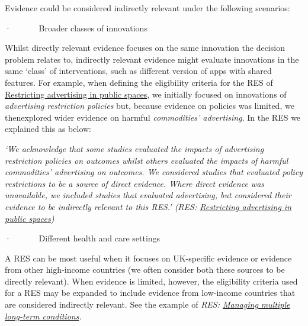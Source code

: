 \documentclass[
  letterpaper,
  DIV=11,
  numbers=noendperiod]{scrreprt}
\begin{document}
Evidence could be considered indirectly relevant under the following
scenarios:

·~~~~~~ Broader classes of innovations

Whilst directly relevant evidence focuses on the same innovation the
decision problem relates to, indirectly relevant evidence might evaluate
innovations in the same `class' of interventions, such as different
version of apps with shared features. For example, when defining the
eligibility criteria for the RES of
\href{https://arc-gm.nihr.ac.uk/media/Resources/ARC/Evaluation/RES/Implementing\%20policies\%20that\%20restrict\%20the\%20use\%20of\%20outdoor\%20spaces\%20for\%20advertising\%20harmful\%20commodities/ARC-GM\%20RES\%20outdoor\%20advertising\%20harmful\%20commodities\%20revised.pdf}{Restricting
advertising in public spaces}, we initially focused on innovations of
\emph{advertising restriction policies} but, because evidence on
policies was limited, we thenexplored wider evidence on harmful
\emph{commodities' advertising}. In the RES we explained this as below:

\emph{`We acknowledge that some studies evaluated the impacts of
advertising restriction policies on outcomes whilst others evaluated the
impacts of harmful commodities' advertising on outcomes. We considered
studies that evaluated policy restrictions to be a source of direct
evidence. Where direct evidence was unavailable, we included studies
that evaluated advertising, but considered their evidence to be
indirectly relevant to this RES.' (RES:
\href{https://arc-gm.nihr.ac.uk/media/Resources/ARC/Evaluation/RES/Implementing\%20policies\%20that\%20restrict\%20the\%20use\%20of\%20outdoor\%20spaces\%20for\%20advertising\%20harmful\%20commodities/ARC-GM\%20RES\%20outdoor\%20advertising\%20harmful\%20commodities\%20revised.pdf}{Restricting
advertising in public spaces})}

·~~~~~~ Different health and care settings

A RES can be most useful when it focuses on UK-specific evidence or
evidence from other high-income countries (we often consider both these
sources to be directly relevant). When evidence is limited, however, the
eligibility criteria used for a RES may be expanded to include evidence
from low-income countries that are considered indirectly relevant. See
the example of \emph{RES:
\href{https://arc-gm.nihr.ac.uk/media/Resources/ARC/Evaluation/RES/Multiple\%20long-term\%20conditions/ARC\%20RES\%20Multiple\%20long\%20term\%20conditions\%20-\%20final\%20report\%20(3).pdf}{Managing
multiple long-term conditions}.}
\end{document}
